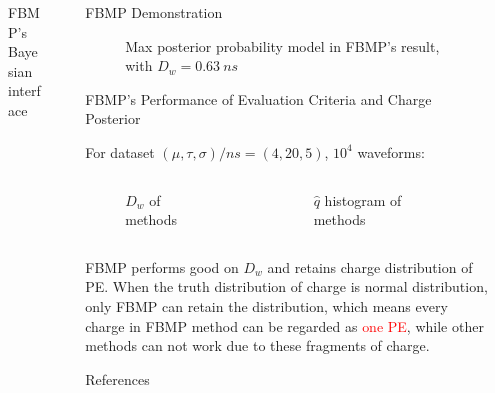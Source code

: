 \documentclass[final]{beamer}
\newlength{\sepwidth}
\newlength{\colwidth}
\newcommand{\separatorcolumn}{\begin{column}{\sepwidth}\end{column}}
\begin{document}
\begin{frame}[t]
\begin{columns}[t]
\begin{column}{\colwidth}
\begin{block}{FBMP's Bayesian interface}
  \end{block}

\end{column}

\separatorcolumn

\begin{column}{\colwidth}

  \begin{block}{FBMP Demonstration}

    \begin{figure}
      \centering
      \resizebox{0.8\textwidth}{!}{}
      \caption{Max posterior probability model in FBMP's result, with $D_w=\SI{0.63}{ns}$}
    \end{figure}

  \end{block}

  \begin{block}{FBMP's Performance of Evaluation Criteria and Charge Posterior}

    For dataset $(\mu, \tau, \sigma)/\si{ns}=(4, 20, 5)$, $10^4$ waveforms: 
    \begin{columns}
      \begin{figure}
        \centering
        \resizebox{\textwidth}{!}{}
        \caption{$D_w$ of methods}
      \end{figure}
      \begin{figure}
        \centering
        \resizebox{\textwidth}{!}{}
        \caption{$\hat{q}$ histogram of methods}
      \end{figure}
    \end{columns}
    FBMP performs good on $D_w$ and retains charge distribution of PE. When the truth distribution of charge is normal distribution, only FBMP can retain the distribution, which means every charge in FBMP method can be regarded as \textcolor{red}{one PE}, while other methods can not work due to these fragments of charge. 

  \end{block}

  \begin{block}{References}

    \footnotesize{}

  \end{block}

\end{column}

\separatorcolumn
\end{columns}
\end{frame}
\end{document}
